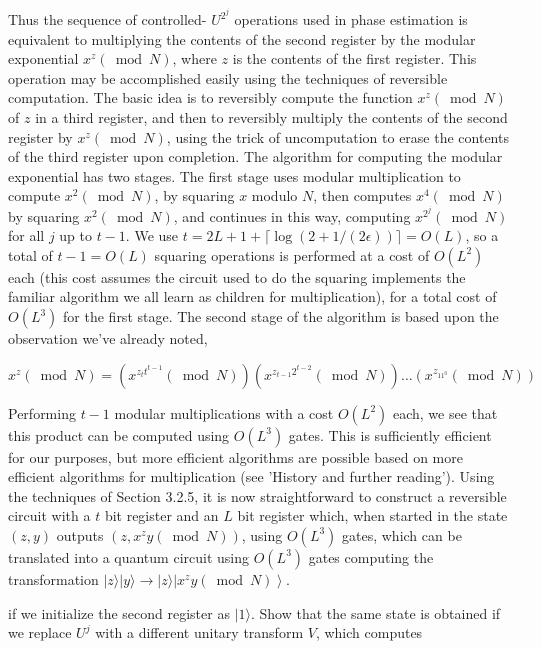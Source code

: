 Thus the sequence of controlled- $U^{2^{j}}$ operations used in phase estimation is equivalent to multiplying the contents of the second register by the modular exponential $x^{z}(\bmod N)$, where $z$ is the contents of the first register. This operation may be accomplished easily using the techniques of reversible computation. The basic idea is to reversibly compute the function $x^{z}(\bmod N)$ of $z$ in a third register, and then to reversibly multiply the contents of the second register by $x^{z}(\bmod N)$, using the trick of uncomputation to erase the contents of the third register upon completion. The algorithm for computing the modular exponential has two stages. The first stage uses modular multiplication to compute $x^{2}(\bmod N)$, by squaring $x$ modulo $N$, then computes $x^{4}(\bmod N)$ by squaring $x^{2}(\bmod N)$, and continues in this way, computing $x^{2^{j}}(\bmod N)$ for all $j$ up to $t-1$. We use $t=2 L+1+\lceil\log (2+1 /(2 \epsilon))\rceil=O(L)$, so a total of $t-1=O(L)$ squaring operations is performed at a cost of $O\left(L^{2}\right)$ each (this cost assumes the circuit used to do the squaring implements the familiar algorithm we all learn as children for multiplication), for a total cost of $O\left(L^{3}\right)$ for the first stage. The second stage of the algorithm is based upon the observation we've already noted,

\begin{equation*}
x^{z}(\bmod N)=\left(x^{z_{t} t^{t-1}}(\bmod N)\right)\left(x^{z_{t-1} 2^{t-2}}(\bmod N)\right) \ldots\left(x^{z_{11^{0}}}(\bmod N)\right) \tag{5.43}
\end{equation*}

Performing $t-1$ modular multiplications with a cost $O\left(L^{2}\right)$ each, we see that this product can be computed using $O\left(L^{3}\right)$ gates. This is sufficiently efficient for our purposes, but more efficient algorithms are possible based on more efficient algorithms for multiplication (see 'History and further reading'). Using the techniques of Section 3.2.5, it is now straightforward to construct a reversible circuit with a $t$ bit register and an $L$ bit register which, when started in the state $(z, y)$ outputs $\left(z, x^{z} y(\bmod N)\right)$, using $O\left(L^{3}\right)$ gates, which can be translated into a quantum circuit using $O\left(L^{3}\right)$ gates computing the transformation $|z\rangle|y\rangle \rightarrow|z\rangle\left|x^{z} y(\bmod N)\right\rangle$.

if we initialize the second register as $|1\rangle$. Show that the same state is obtained if we replace $U^{j}$ with a different unitary transform $V$, which computes

